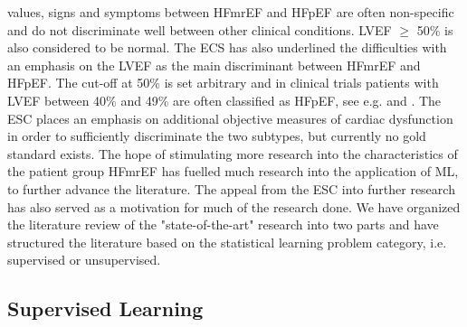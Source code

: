 \documentclass[../thesis.tex]{subfiles}
\begin{document}


\noindent values, signs and symptoms between HFmrEF and HFpEF are often non-specific and do not discriminate well between other clinical conditions. LVEF $\geq$ 50\% is also considered to be normal. The ECS has also underlined the difficulties with an emphasis on the LVEF as the main discriminant between HFmrEF and HFpEF. The cut-off at 50\% is set arbitrary and in clinical trials patients with LVEF between 40\% and 49\% are often classified as HFpEF, see e.g. \cite{kelly2015patient} and \cite{ponikowski2016}. The ESC places an emphasis on additional objective measures of cardiac dysfunction in order to sufficiently discriminate the two subtypes, but currently no gold standard exists. The hope of stimulating more research into the characteristics of the patient group HFmrEF has fuelled much research into the application of ML, to further advance the literature. The appeal from the ESC into further research has also served as a motivation for much of the research done.  We have organized the literature review of the "state-of-the-art" research into two parts and have structured the literature based on the statistical learning problem category, i.e. supervised or unsupervised.

\subsection{Supervised Learning}
\label{subsec:supervisedlearn}
\end{document}
